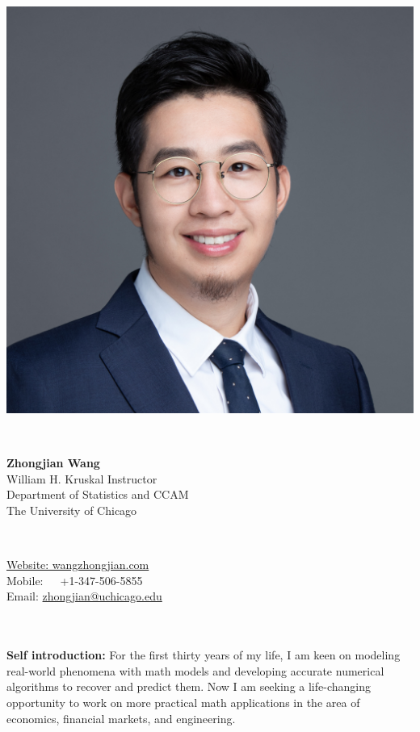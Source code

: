 \documentclass[a4paper,20pt]{article}
\begin{document}
	
	\begin{minipage}{0.2\textwidth}
		\includegraphics[width=\linewidth]{wang_square}
	\end{minipage}~\hspace{1em}
\begin{minipage}{0.5 \textwidth}
	\textbf{{\LARGE Zhongjian Wang}} \\
	William H. Kruskal Instructor\\
	Department of Statistics and CCAM
	\\
	The University of Chicago 
\end{minipage}~
\begin{minipage}{0.3\textwidth}

		\href{http://www.wangzhongjian.com}{Website: wangzhongjian.com} \\ Mobile:~~~+1-347-506-5855 \\
	Email: \href{mailto:}{zhongjian@uchicago.edu}
\end{minipage}
\\
\hspace{2em}
\\
\textbf{Self introduction:}
For the first thirty years of my life, I am keen on modeling real-world phenomena with math models and developing accurate numerical algorithms to recover and predict them. Now I am seeking a life-changing opportunity to work on more practical math applications in the area of economics, financial markets, and engineering. 
\end{document}
